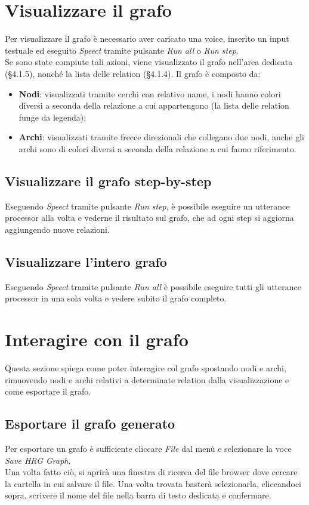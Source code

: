 \documentclass[openany,12pt,a4paper]{report}
\begin{document}
	\section{Visualizzare il grafo}
	Per visualizzare il grafo è necessario aver caricato una voice, inserito un input testuale ed eseguito \textit{Speect} tramite pulsante \textit{Run all} o \textit{Run step}.\\
	Se sono state compiute tali azioni, viene visualizzato il grafo nell'area dedicata (§4.1.5), nonché la lista delle relation (§4.1.4).
	Il grafo è composto da:
	\begin{itemize}
		\item \textbf{Nodi}: visualizzati tramite cerchi con relativo name, i nodi hanno colori diversi a seconda della relazione a cui appartengono (la lista delle relation funge da legenda);
		\item \textbf{Archi}: visualizzati tramite frecce direzionali che collegano due nodi, anche gli archi sono di colori diversi a seconda della relazione a cui fanno riferimento.
	\end{itemize}
	
	\subsection{Visualizzare il grafo step-by-step}
	Eseguendo \textit{Speect} tramite pulsante \textit{Run step}, è possibile eseguire un utterance processor alla volta e vederne il risultato sul grafo, che ad ogni step si aggiorna aggiungendo nuove relazioni.
	
	\subsection{Visualizzare l'intero grafo}
	Eseguendo \textit{Speect} tramite pulsante \textit{Run all} è possibile eseguire tutti gli utterance processor in una sola volta e vedere subito il grafo completo.
	
	\section{Interagire con il grafo}
	Questa sezione spiega come poter interagire col grafo spostando nodi e archi, rimuovendo nodi e archi relativi a determinate relation dalla visualizzazione e come esportare il grafo.
	
	\subsection{Esportare il grafo generato}
	Per esportare un grafo è sufficiente cliccare \textit{File} dal menù e selezionare la voce \textit{Save HRG Graph}.\\
	Una volta fatto ciò, si aprirà una finestra di ricerca del file browser dove cercare la cartella in cui salvare il file. Una volta trovata basterà selezionarla, cliccandoci sopra, scrivere il nome del file nella barra di testo dedicata e confermare.
	
\end{document}
